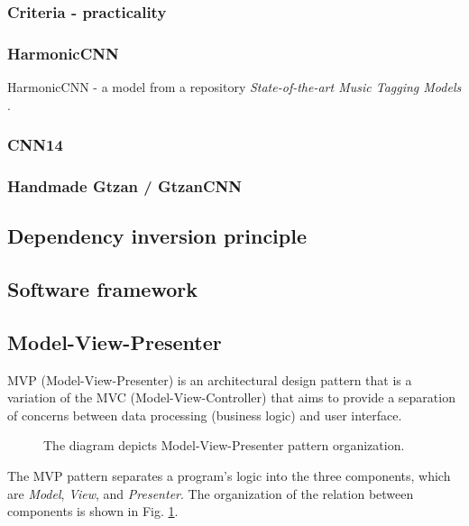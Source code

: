 \documentclass[
    bindingoffset=5mm,  %
    footnoteindent=3mm, %
    hyphenation=true    %
]{src/wut-thesis}
\begin{document}
\subsubsection{Criteria - practicality}
\subsubsection{HarmonicCNN}
HarmonicCNN - a model from a repository \textit{State-of-the-art Music Tagging Models} \cite{Won2020-ej}.
\subsubsection{CNN14}
\subsubsection{Handmade Gtzan / GtzanCNN}


\subsection{Dependency inversion principle} \label{ch2:DependencyInversion}

\subsection{Software framework} %

\subsection{Model-View-Presenter} \label{ch2:ModelViewController}

MVP (Model-View-Presenter) \cite{Potel2011} is an architectural design pattern that is a variation
of the MVC (Model-View-Controller) that aims to provide a separation of concerns between
data processing (business logic) and user interface.

\begin{figure}[h!] %
    \centering
    
    \caption{The diagram depicts Model-View-Presenter pattern organization.}
    \label{fig:MvpDiagram}
\end{figure}

The MVP pattern separates a program’s logic into the three components, which are
\emph{Model}, \emph{View}, and \emph{Presenter}. The organization of the relation
between components is shown in Fig. \ref{fig:MvpDiagram}.
\end{document}
